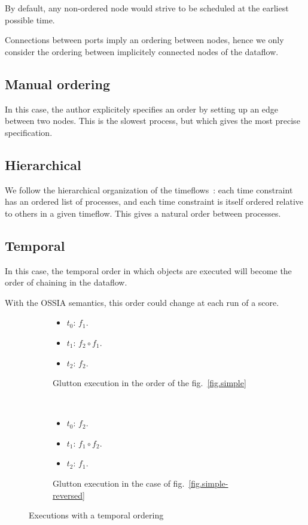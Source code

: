\documentclass{article}
\begin{document}
By default, any non-ordered node would strive to be scheduled at the earliest possible time.
    
Connections between ports imply an ordering between nodes, hence we only consider the ordering between implicitely connected nodes of the dataflow.
    
\subsection{Manual ordering}
In this case, the author explicitely specifies an order by setting up an edge between two nodes. 
This is the slowest process, but which gives the most precise specification.
    
\subsection{Hierarchical}
We follow the hierarchical organization of the timeflows~: each time constraint has an ordered list of processes, and each time constraint is itself ordered relative to others in a given timeflow. 
This gives a natural order between processes.
    
\subsection{Temporal}
In this case, the temporal order in which objects are executed
will become the order of chaining in the dataflow.

With the OSSIA semantics, this order could change at each run of a score.
    
\begin{figure}[h]
  \begin{subfigure}{0.20\textwidth }    		    		
    \begin{itemize}
      \item $t_0$: $f_1$.
      \item $t_1$: $f_2 \circ f_1$.
      \item $t_2$: $f_2$. 
    \end{itemize}
    \caption{Glutton execution in the order of the fig.~\ref{fig.simple}}
  \end{subfigure}~
  \begin{subfigure}{0.20\textwidth}
    		    	
    \begin{itemize}
      \item $t_0$: $f_2$.
      \item $t_1$: $f_1 \circ f_2$.
      \item $t_2$: $f_1$. 
    \end{itemize}
    \caption{
    	Glutton execution in the case of fig.~\ref{fig.simple-reversed}}
  \end{subfigure}
  \caption{Executions with a temporal ordering}
\end{figure}
    
\end{document}
